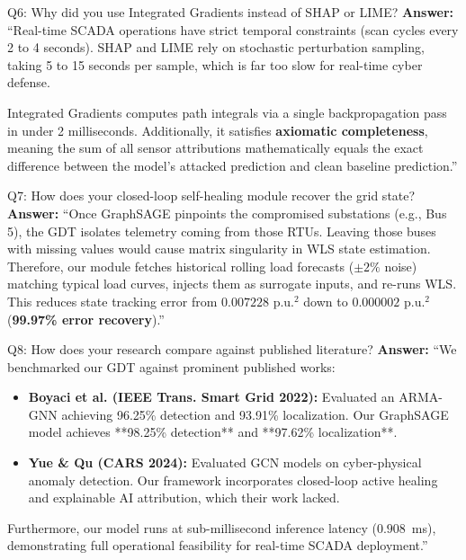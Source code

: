 \documentclass[10pt,a4paper]{article}
\begin{document}
\begin{qabox}{Q6: Why did you use Integrated Gradients instead of SHAP or LIME?}
\textbf{Answer:}
``Real-time SCADA operations have strict temporal constraints (scan cycles every 2 to 4 seconds). SHAP and LIME rely on stochastic perturbation sampling, taking 5 to 15 seconds per sample, which is far too slow for real-time cyber defense. 

Integrated Gradients computes path integrals via a single backpropagation pass in under 2 milliseconds. Additionally, it satisfies \textbf{axiomatic completeness}, meaning the sum of all sensor attributions mathematically equals the exact difference between the model's attacked prediction and clean baseline prediction.''
\end{qabox}

\begin{qabox}{Q7: How does your closed-loop self-healing module recover the grid state?}
\textbf{Answer:}
``Once GraphSAGE pinpoints the compromised substations (e.g., Bus 5), the GDT isolates telemetry coming from those RTUs. Leaving those buses with missing values would cause matrix singularity in WLS state estimation. Therefore, our module fetches historical rolling load forecasts ($\pm 2\%$ noise) matching typical load curves, injects them as surrogate inputs, and re-runs WLS. This reduces state tracking error from $0.007228\text{ p.u.}^2$ down to $0.000002\text{ p.u.}^2$ (\textbf{99.97\% error recovery}).''
\end{qabox}

\begin{qabox}{Q8: How does your research compare against published literature?}
\textbf{Answer:}
``We benchmarked our GDT against prominent published works:
\begin{itemize}[noitemsep]
    \item \textbf{Boyaci et al. (IEEE Trans. Smart Grid 2022):} Evaluated an ARMA-GNN achieving 96.25\% detection and 93.91\% localization. Our GraphSAGE model achieves **98.25\% detection** and **97.62\% localization**.
    \item \textbf{Yue \& Qu (CARS 2024):} Evaluated GCN models on cyber-physical anomaly detection. Our framework incorporates closed-loop active healing and explainable AI attribution, which their work lacked.
\end{itemize}
Furthermore, our model runs at sub-millisecond inference latency ($0.908$~ms), demonstrating full operational feasibility for real-time SCADA deployment.''
\end{qabox}
\end{document}
